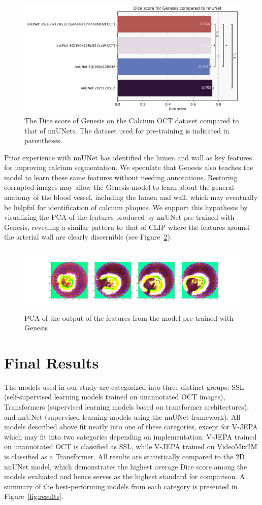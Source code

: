 \documentclass[a4paper,11pt,oneside]{report}
\begin{document}
\begin{figure}[h]
    \centering
    \includegraphics[width=0.65\linewidth]{figures/result_nnUNet_and_Genesis_results.png}
    \caption{The Dice score of Genesis on the Calcium OCT dataset compared to that of nnUNets. The dataset used for pre-training is indicated in parentheses.
    }
    \label{fig:genesis-results}    
\end{figure}

Prior experience with nnUNet has identified the lumen and wall as key features for improving calcium segmentation. We speculate that Genesis also teaches the model to learn these same features without needing annotations. Restoring corrupted images may allow the Genesis model to learn about the general anatomy of the blood vessel, including the lumen and wall, which may eventually be helpful for identification of calcium plaques. We support this hypothesis by visualizing the PCA of the features produced by nnUNet pre-trained with Genesis, revealing a similar pattern to that of CLIP where the features around the arterial wall are clearly discernible (see Figure~\ref{fig:pca-genesis}). 

\begin{figure}[h]
    \centering
    \includegraphics[width=0.5\linewidth]{figures/discussion_genesis_feature_map_batch0_feature1.png}
    \caption{PCA of the output of the features from the model pre-trained with Genesis}
    \label{fig:pca-genesis}
\end{figure}


\section{Final Results}
The models used in our study are categorized into three distinct groups: SSL (self-supervised learning models trained on unannotated OCT images), Transformers (supervised learning models based on transformer architectures), and nnUNet (supervised learning models using the nnUNet framework). All models described above fit neatly into one of these categories, except for V-JEPA which may fit into two categories depending on implementation: V-JEPA trained on unannotated OCT is classified as SSL, while V-JEPA trained on VideoMix2M is classified as a Transformer. All results are statistically compared to the 2D nnUNet model, which demonstrates the highest average Dice score among the models evaluated and hence serves as the highest standard for comparison. A summary of the best-performing models from each category is presented in Figure~\ref{fig:results}.
\end{document}
